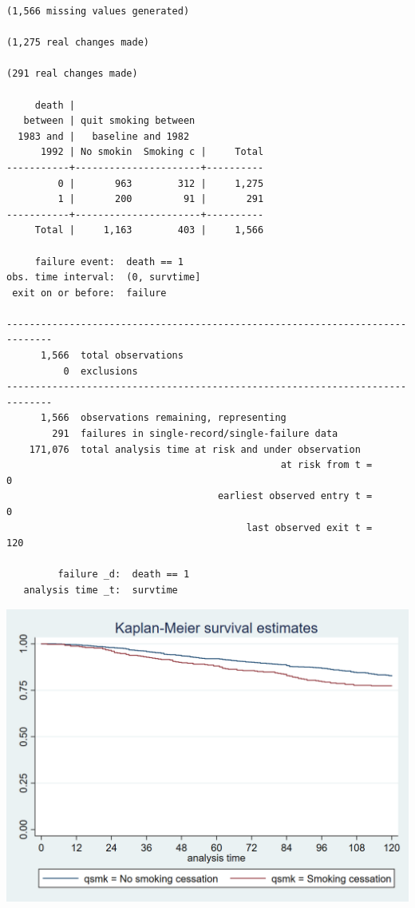 \documentclass[
  10pt,
]{book}
\begin{document}
\begin{verbatim}
(1,566 missing values generated)

(1,275 real changes made)

(291 real changes made)

     death |
   between | quit smoking between
  1983 and |   baseline and 1982
      1992 | No smokin  Smoking c |     Total
-----------+----------------------+----------
         0 |       963        312 |     1,275 
         1 |       200         91 |       291 
-----------+----------------------+----------
     Total |     1,163        403 |     1,566 

     failure event:  death == 1
obs. time interval:  (0, survtime]
 exit on or before:  failure

------------------------------------------------------------------------------
      1,566  total observations
          0  exclusions
------------------------------------------------------------------------------
      1,566  observations remaining, representing
        291  failures in single-record/single-failure data
    171,076  total analysis time at risk and under observation
                                                at risk from t =         0
                                     earliest observed entry t =         0
                                          last observed exit t =       120

         failure _d:  death == 1
   analysis time _t:  survtime
\end{verbatim}

\begin{center}\includegraphics[width=0.85\linewidth]{./figs/stata-fig-17-1} \end{center}
\end{document}
